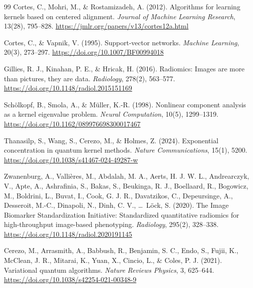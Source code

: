\begin{thebibliography}{99}
    Cortes, C., Mohri, M., \& Rostamizadeh, A. (2012).
    Algorithms for learning kernels based on centered alignment.
    \textit{Journal of Machine Learning Research}, 13(28), 795--828.
    \url{https://jmlr.org/papers/v13/cortes12a.html}

    Cortes, C., \& Vapnik, V. (1995).
    Support-vector networks.
    \textit{Machine Learning}, 20(3), 273--297.
    \url{https://doi.org/10.1007/BF00994018}

    Gillies, R. J., Kinahan, P. E., \& Hricak, H. (2016).
    Radiomics: Images are more than pictures, they are data.
    \textit{Radiology}, 278(2), 563--577.
    \url{https://doi.org/10.1148/radiol.2015151169}

    Sch{\"o}lkopf, B., Smola, A., \& M{\"u}ller, K.-R. (1998).
    Nonlinear component analysis as a kernel eigenvalue problem.
    \textit{Neural Computation}, 10(5), 1299--1319.
    \url{https://doi.org/10.1162/089976698300017467}

    Thanasilp, S., Wang, S., Cerezo, M., \& Holmes, Z. (2024).
    Exponential concentration in quantum kernel methods.
    \textit{Nature Communications}, 15(1), 5200.
    \url{https://doi.org/10.1038/s41467-024-49287-w}

    Zwanenburg, A., Valli\`eres, M., Abdalah, M. A., Aerts, H. J. W. L., Andrearczyk, V., Apte, A., Ashrafinia, S., Bakas, S., Beukinga, R. J., Boellaard, R., Bogowicz, M., Boldrini, L., Buvat, I., Cook, G. J. R., Davatzikos, C., Depeursinge, A., Desseroit, M.-C., Dinapoli, N., Dinh, C. V., \ldots\ L\"ock, S. (2020).
    The Image Biomarker Standardization Initiative: Standardized quantitative radiomics for high-throughput image-based phenotyping.
    \textit{Radiology}, 295(2), 328--338.
    \url{https://doi.org/10.1148/radiol.2020191145}

    Cerezo, M., Arrasmith, A., Babbush, R., Benjamin, S. C., Endo, S., Fujii, K., McClean, J. R., Mitarai, K., Yuan, X., Cincio, L., \& Coles, P. J. (2021). Variational quantum algorithms. \textit{Nature Reviews Physics}, 3, 625--644. \url{https://doi.org/10.1038/s42254-021-00348-9}



\end{thebibliography}
